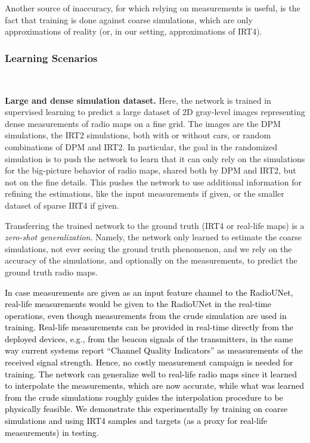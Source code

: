 \documentclass[10pt,a4paper]{article}
\begin{document}
Another source of inaccuracy, for which relying on measurements is useful, is the fact that training is done against coarse simulations, which are only approximations of reality (or, in our setting, approximations of IRT4).


\subsubsection{Learning Scenarios}
\label{Learning scenarios} $ $


\par{\noindent\textbf{Large and dense simulation dataset.}} Here, the network is trained in supervised learning to predict a large dataset of 2D gray-level images representing dense measurements of radio maps on a fine grid. The images are the DPM simulations, the IRT2 simulations, both with or without cars, or random combinations of DPM and IRT2. 
In particular, the goal in the randomized simulation is to push the network to learn that it can only rely on the simulations for the big-picture behavior of radio maps, shared both by DPM and IRT2, but not on the fine details. This pushes the network to use additional information for refining the estimations, like the input measurements if given, or the smaller dataset of sparse IRT4 if given.  


Transferring the trained network to the ground truth (IRT4 or real-life maps) 
is a \emph{zero-shot generalization}. Namely, the network only learned to estimate the coarse simulations, not ever seeing the ground truth phenomenon, and we rely on the accuracy of the simulations, and optionally on the measurements, to predict the ground truth radio maps. 

\textcolor{black}{In case measurements are given as an input feature channel to the RadioUNet, 
real-life measurements would be given to the RadioUNet in the real-time operations, 
even though measurements from the crude simulation are used in training.
Real-life measurements can be provided in real-time directly from the deployed devices, e.g., from the beacon signals of the transmitters, in the same way current systems report ``Channel Quality Indicators'' as measurements of the received signal strength.  Hence,  no costly measurement campaign is needed for training. 
The network can generalize well to real-life radio maps since it learned to interpolate the measurements, 
which are now accurate, while what was learned from the crude simulations roughly guides the interpolation procedure to be physically feasible. We demonstrate this experimentally by training on coarse simulations and using IRT4 samples and targets (as a proxy for real-life measurements) in testing.} 
\end{document}
